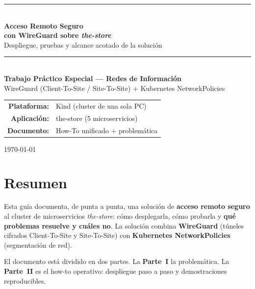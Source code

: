 \documentclass[11pt,a4paper]{article}
\begin{document}
\begin{titlepage}
\thispagestyle{empty}
\centering
\vspace*{2.2cm}

{\color{azulvpn}\rule{\linewidth}{1.2pt}}\\[0.5cm]
{\Huge\bfseries\color{azulvpn} Acceso Remoto Seguro\\[0.25cm] con WireGuard sobre \textit{the-store}}\\[0.4cm]
{\large Despliegue, pruebas y alcance acotado de la solución}\\[0.3cm]
{\color{azulvpn}\rule{\linewidth}{1.2pt}}\\[1.4cm]

{\large\bfseries Trabajo Práctico Especial — Redes de Información}\\[0.4cm]
{\large WireGuard (Client-To-Site / Site-To-Site) + Kubernetes NetworkPolicies}\\[2.2cm]

\begin{tabular}{rl}
\textbf{Plataforma:} & Kind (cluster de una sola PC) \\[4pt]
\textbf{Aplicación:}  & the-store (5 microservicios) \\[4pt]
\textbf{Documento:}   & How-To unificado + problemática \\
\end{tabular}

\vfill
{\large\today}
\end{titlepage}

\section*{Resumen}
Esta guía documenta, de punta a punta, una solución de \textbf{acceso remoto
seguro} al cluster de microservicios \textit{the-store}: cómo desplegarla, cómo
probarla y \textbf{qué problemas resuelve y cuáles no}. La
solución combina \textbf{WireGuard} (túneles cifrados Client-To-Site y
Site-To-Site) con \textbf{Kubernetes NetworkPolicies} (segmentación de red).

El documento está dividido en dos partes. La \textbf{Parte~I} la
problemática. La \textbf{Parte~II} es el how-to operativo:
despliegue paso a paso y demostraciones reproducibles.

\newpage
\tableofcontents
\newpage
\end{document}
